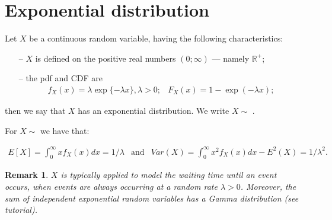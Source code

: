 \documentclass[smaller]{beamer}\usepackage[]{graphicx}\usepackage[]{color}
\newtheorem{remark}{Remark}[section]
\newcommand{\bea}{\begin{eqnarray}}
\newcommand{\eea}{\end{eqnarray}}
\newcommand{\nn}{\nonumber}
\begin{document}
\section{Exponential distribution}

\begin{frame}{\secname}
  \begin{definition}
  Let $X$ be a  continuous random variable, having the following  characteristics:
  \begin{itemize}
  \item[--]       $X$ is defined on the positive real numbers $\left( 0;\infty \right) $ --- namely $\mathbb{R}^+$;
  \item[--]       the pdf and CDF are
  \bea
  f_X(x)=\lambda \exp\{ -\lambda x\},\lambda
  >0; &
  F_X(x)=1-\exp (-\lambda x); \nn \eea
  \end{itemize}
  then we say that $X$ has an exponential distribution. We write $X\sim$ .
  \end{definition}
\pause
  For $X\sim$  we have that:
  \begin{small}
  \bea
  E[X]=\int_{0}^{\infty }xf_X(x )dx= 1/\lambda & \text{and} &   Var(X)=\int_{0}^{\infty }x^{2}f_X(x )dx-E^{2}(X)=1/\lambda ^{2}. \nn
  \eea
  \end{small}
\pause
  \begin{remark}
  $X$ is typically applied to model the waiting time until an event occurs, when events are always occurring at a random rate $\lambda >0$. Moreover, the sum of independent exponential random variables has a Gamma distribution (see tutorial).
  \end{remark}
\end{frame}
\end{document}
